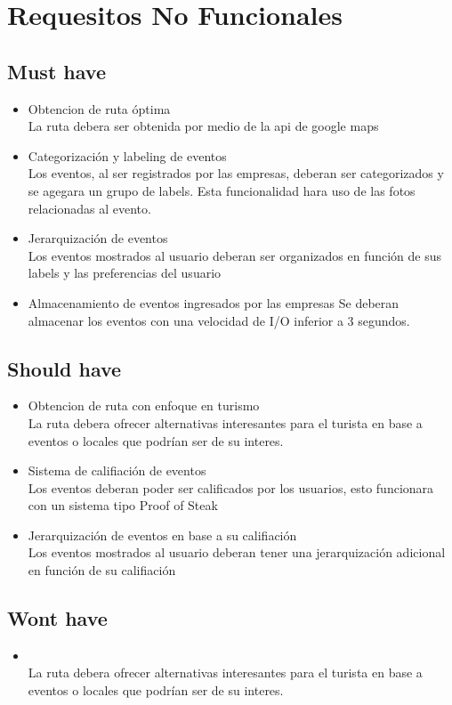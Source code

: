 \documentclass[a4paper,12pt,oneside]{article}
\begin{document}
\section{Requesitos No Funcionales}

\subsection{Must have}
  \begin{itemize}
    \item Obtencion de ruta óptima \\
      La ruta debera ser obtenida por medio de la api de google maps
    \item Categorización y labeling de eventos \\
      Los eventos, al ser registrados por las empresas, deberan ser categorizados y se agegara un grupo de labels. Esta funcionalidad hara uso de las fotos relacionadas al evento.
    \item Jerarquización de eventos \\
      Los eventos mostrados al usuario deberan ser organizados en función de sus labels y las preferencias del usuario
    \item Almacenamiento de eventos ingresados por las empresas
      Se deberan almacenar los eventos con una velocidad de I/O inferior a 3 segundos.
  \end{itemize}

\subsection{Should have}
  \begin{itemize}
    \item Obtencion de ruta con enfoque en turismo \\
      La ruta debera ofrecer alternativas interesantes para el turista en base a eventos o locales que podrían ser de su interes.
    \item Sistema de califiación de eventos \\
      Los eventos deberan poder ser calificados por los usuarios, esto funcionara con un sistema tipo Proof of Steak
    \item Jerarquización de eventos en base a su califiación \\
      Los eventos mostrados al usuario deberan tener una jerarquización adicional en función de su califiación
  \end{itemize}

\subsection{Wont have}
  \begin{itemize}
    \item  \\
      La ruta debera ofrecer alternativas interesantes para el turista en base a eventos o locales que podrían ser de su interes.
  \end{itemize}

\printbibliography[title={Bibliography}]
\end{document}
